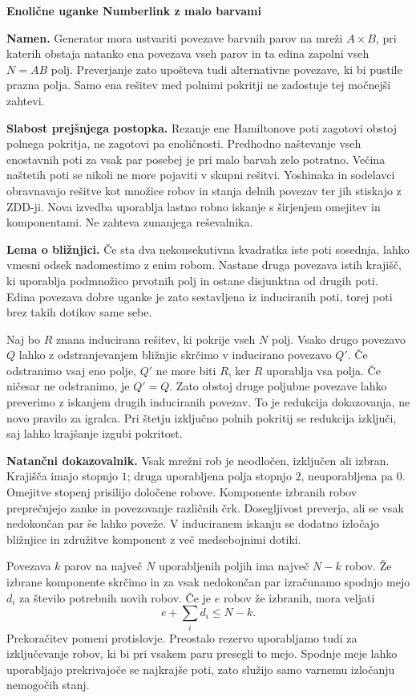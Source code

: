 \documentclass[12pt,a4paper]{article}
\begin{document}
{\Large\bfseries Enolične uganke Numberlink z malo barvami}

\textbf{Namen.} Generator mora ustvariti povezave barvnih parov na mreži \(A\times B\), pri katerih obstaja natanko ena povezava vseh parov in ta edina zapolni vseh \(N=AB\) polj. Preverjanje zato upošteva tudi alternativne povezave, ki bi pustile prazna polja. Samo ena rešitev med polnimi pokritji ne zadostuje tej močnejši zahtevi.

\textbf{Slabost prejšnjega postopka.} Rezanje ene Hamiltonove poti zagotovi obstoj polnega pokritja, ne zagotovi pa enoličnosti. Predhodno naštevanje vseh enostavnih poti za vsak par posebej je pri malo barvah zelo potratno. Večina naštetih poti se nikoli ne more pojaviti v skupni rešitvi. Yoshinaka in sodelavci~\cite{zdd} obravnavajo rešitve kot množice robov in stanja delnih povezav ter jih stiskajo z ZDD-ji. Nova izvedba uporablja lastno robno iskanje s širjenjem omejitev in komponentami. Ne zahteva zunanjega reševalnika.

\textbf{Lema o bližnjici.} Če sta dva nekonsekutivna kvadratka iste poti sosednja, lahko vmesni odsek nadomestimo z enim robom. Nastane druga povezava istih krajišč, ki uporablja podmnožico prvotnih polj in ostane disjunktna od drugih poti. Edina povezava dobre uganke je zato sestavljena iz induciranih poti, torej poti brez takih dotikov same sebe.

Naj bo \(R\) znana inducirana rešitev, ki pokrije vseh \(N\) polj. Vsako drugo povezavo \(Q\) lahko z odstranjevanjem bližnjic skrčimo v inducirano povezavo \(Q'\). Če odstranimo vsaj eno polje, \(Q'\) ne more biti \(R\), ker \(R\) uporablja vsa polja. Če ničesar ne odstranimo, je \(Q'=Q\). Zato obstoj druge poljubne povezave lahko preverimo z iskanjem drugih induciranih povezav. To je redukcija dokazovanja, ne novo pravilo za igralca. Pri štetju izključno polnih pokritij se redukcija izključi, saj lahko krajšanje izgubi pokritost.

\textbf{Natančni dokazovalnik.} Vsak mrežni rob je neodločen, izključen ali izbran. Krajišča imajo stopnjo \(1\); druga uporabljena polja stopnjo \(2\), neuporabljena pa \(0\). Omejitve stopenj prisilijo določene robove. Komponente izbranih robov preprečujejo zanke in povezovanje različnih črk. Dosegljivost preverja, ali se vsak nedokončan par še lahko poveže. V induciranem iskanju se dodatno izločajo bližnjice in združitve komponent z več medsebojnimi dotiki.

Povezava \(k\) parov na največ \(N\) uporabljenih poljih ima največ \(N-k\) robov. Že izbrane komponente skrčimo in za vsak nedokončan par izračunamo spodnjo mejo \(d_i\) za število potrebnih novih robov. Če je \(e\) robov že izbranih, mora veljati
\[
e+\sum_i d_i\leq N-k.
\]
Prekoračitev pomeni protislovje. Preostalo rezervo uporabljamo tudi za izključevanje robov, ki bi pri vsakem paru presegli to mejo. Spodnje meje lahko uporabljajo prekrivajoče se najkrajše poti, zato služijo samo varnemu izločanju nemogočih stanj.
\end{document}
